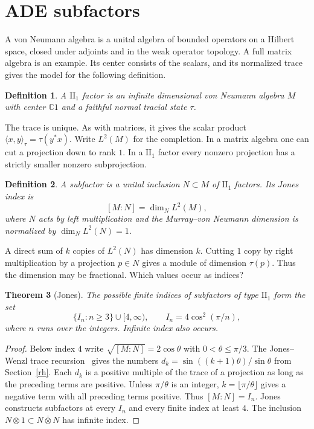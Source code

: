 \documentclass[11pt,a4paper]{article}
\newtheorem{thm}{Theorem}[section]
\newtheorem{defn}[thm]{Definition}
\begin{document}
\section{ADE subfactors}\label{jones-section}
A von Neumann algebra is a unital algebra of bounded operators on a Hilbert space, closed under adjoints and in the weak operator topology. A full matrix algebra is an example. Its center consists of the scalars, and its normalized trace gives the model for the following definition.

\begin{samepage}
\begin{defn}
A $\mathrm{II}_1$ factor is an infinite dimensional von Neumann algebra $M$ with center $\mathbb C1$ and a faithful normal tracial state $\tau$.
\end{defn}
\end{samepage}

The trace is unique. As with matrices, it gives the scalar product $\langle x,y\rangle_\tau=\tau(y^*x)$. Write $L^2(M)$ for the completion. In a matrix algebra one can cut a projection down to rank $1$. In a $\mathrm{II}_1$ factor every nonzero projection has a strictly smaller nonzero subprojection.

\begin{samepage}
\begin{defn}
A subfactor is a unital inclusion $N\subset M$ of $\mathrm{II}_1$ factors. Its Jones index is
\[
 [M:N]=\dim_N L^2(M),
\]
where $N$ acts by left multiplication and the Murray--von Neumann dimension is normalized by $\dim_N L^2(N)=1$.
\end{defn}
\end{samepage}

A direct sum of $k$ copies of $L^2(N)$ has dimension $k$. Cutting $1$ copy by right multiplication by a projection $p\in N$ gives a module of dimension $\tau(p)$. Thus the dimension may be fractional. Which values occur as indices?

\begin{samepage}
\begin{thm}[Jones]\label{index-range}
The possible finite indices of subfactors of type $\mathrm{II}_1$ form the set
\[
 \{I_n:n\geq3\}\cup[4,\infty),\qquad I_n=4\cos^2(\pi/n),
\]
where $n$ runs over the integers. Infinite index also occurs.
\end{thm}
\end{samepage}
\begin{proof}
Below index $4$ write $\sqrt{[M:N]}=2\cos\theta$ with $0<\theta\leq\pi/3$. The Jones--Wenzl trace recursion~\cite{js} gives the numbers $d_k=\sin((k+1)\theta)/\sin\theta$ from Section~\ref{rh}. Each $d_k$ is a positive multiple of the trace of a projection as long as the preceding terms are positive. Unless $\pi/\theta$ is an integer, $k=\lfloor\pi/\theta\rfloor$ gives a negative term with all preceding terms positive. Thus $[M:N]=I_n$. Jones~\cite{jones} constructs subfactors at every $I_n$ and every finite index at least $4$. The inclusion $N\otimes1\subset N\mathbin{\overline\otimes}N$ has infinite index.
\end{proof}
\end{document}
